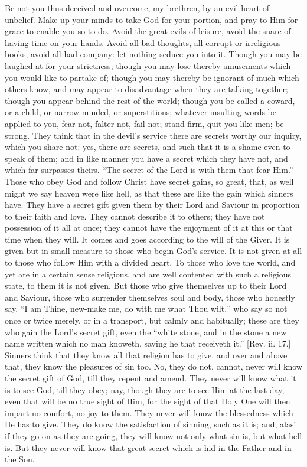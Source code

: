 Be not you thus deceived and overcome, my brethren, by an evil
heart of unbelief. Make up your minds to take God for your portion,
and pray to Him for grace to enable you so to do. Avoid the great
evils of leisure, avoid the snare of having time on your hands. Avoid
all bad thoughts, all corrupt or irreligious books, avoid all bad
company: let nothing seduce you into it. Though you may be laughed at
for your strictness; though you may lose thereby amusements which you
would like to partake of; though you may thereby be ignorant of much
which others know, and may appear to disadvantage when they are
talking together; though you appear behind the rest of the world;
though you be called a coward, or a child, or narrow-minded, or
superstitious; whatever insulting words be applied to you, fear not,
falter not, fail not; stand firm, quit you like men; be strong. They
think that in the devil's service there are secrets worthy our
inquiry, which you share not: yes, there are secrets, and such that it
is a shame even to speak of them; and in like manner you have a secret
which they have not, and which far surpasses theirs. ``The secret
of the Lord is with them that fear Him.'' Those who obey God and
follow Christ have secret gains, so great, that, as well might we say
heaven were like hell, as that these are like the gain which sinners
have. They have a secret gift given them by their Lord and Saviour in
proportion to their faith and love. They cannot describe it to others;
they have not possession of it all at once; they cannot have the
enjoyment of it at this or that time when they will. It comes and goes
according to the will of the Giver. It is given but in small measure
to those who begin God's service. It is not given at all to those who
follow Him with a divided heart. To those who love the world, and yet
are in a certain sense religious, and are well contented with such a
religious state, to them it is not given. But those who give
themselves up to their Lord and Saviour, those who surrender
themselves soul and body, those who honestly say, ``I am Thine,
new-make me, do with me what Thou wilt,'' who say so not once or
twice merely, or in a transport, but calmly and habitually; these are
they who gain the Lord's secret gift, even the ``white stone, and
in the stone a new name written which no man knoweth, saving he that
receiveth it.'' [Rev. ii. 17.] Sinners think that they know all
that religion has to give, and over and above that, they know the
pleasures of sin too. No, they do not, cannot, never will know the
secret gift of God, till they repent and amend. They never will know
what it is to see God, till they obey; nay, though they are to see Him
at the last day, even that will be no true sight of Him, for the sight
of that Holy One will then impart no comfort, no joy to them. They
never will know the blessedness which He has to give. They do know the
satisfaction of sinning, such as it is; and, alas! if they go on as
they are going, they will know not only what sin is, but what hell is.
But they never will know that great secret which is hid in the Father
and in the Son.


